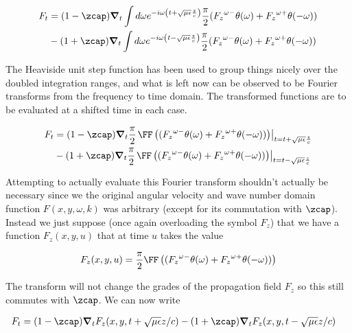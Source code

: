 \begin{align*}%
F_t 
&= 
(1 - \zcap) \spacegrad_t
\int d\omega e^{-i\omega \left(t + \sqrt{\mu\epsilon}\frac{z}{c}\right)}
\frac{\pi}{2}({F_z}^{\omega-}\theta(\omega) + {F_z}^{\omega+}\theta(-\omega)) \\
&-(1 + \zcap) \spacegrad_t
\int d\omega e^{-i\omega \left(t - \sqrt{\mu\epsilon}\frac{z}{c}\right)}
\frac{\pi}{2}({F_z}^{\omega-}\theta(\omega) + {F_z}^{\omega+}\theta(-\omega))
\end{align*}

The Heaviside unit step function has been used to group things nicely over the doubled integration ranges, and what is left now can be observed to be Fourier transforms from the frequency to time domain.  The transformed functions are to be evaluated at a shifted time in each case.

\begin{align*}%
F_t 
&= 
(1 - \zcap) \spacegrad_t
\frac{\pi}{2}{\left.\FF\left( ({F_z}^{\omega-}\theta(\omega) + {F_z}^{\omega+}\theta(-\omega)) \right)\right\vert}_{t=t + \sqrt{\mu\epsilon}\frac{z}{c}} \\
&
-(1 + \zcap) \spacegrad_t
\frac{\pi}{2}{\left.\FF\left( ({F_z}^{\omega-}\theta(\omega) + {F_z}^{\omega+}\theta(-\omega)) \right)\right\vert}_{t=t - \sqrt{\mu\epsilon}\frac{z}{c}}
\end{align*}

Attempting to actually evaluate this Fourier transform shouldn't actually be necessary since we the original angular velocity and wave number domain function $F(x,y,\omega,k)$ was arbitrary (except for its commutation with $\zcap$).  Instead we just suppose (once again overloading the symbol $F_z$) that we have a function $F_z(x,y,u)$ that at time $u$ takes the value

\begin{align*}
F_z(x,y,u) = \frac{\pi}{2}\FF\left( ({F_z}^{\omega-}\theta(\omega) + {F_z}^{\omega+}\theta(-\omega)) \right)
\end{align*}

The transform will not change the grades of the propagation field $F_z$ so this still commutes with $\zcap$.  We can now write

\begin{align}\label{eqn:waveguideRetardedAdvanced:fooZ}
F_t 
&= 
(1 - \zcap) \spacegrad_t F_z(x,y, t + \sqrt{\mu\epsilon}{z}/{c})
-(1 + \zcap) \spacegrad_t F_z(x,y, t - \sqrt{\mu\epsilon}{z}/{c})
\end{align}

